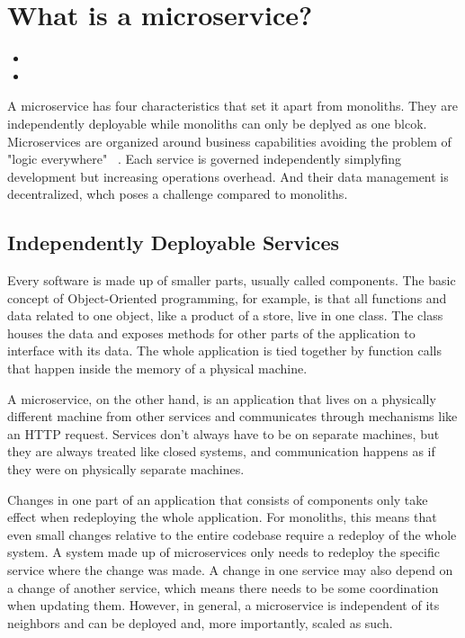 \section{What is a microservice?}
\label{sec:theory:what}

\begin{itemize}
  \item {}
  \item {}
\end{itemize}

A microservice has four characteristics that set it apart from monoliths. They are independently deployable while monoliths can only be deplyed as one blcok. Microservices are organized around business capabilities avoiding the problem of "logic everywhere" ~\cite{microservices.2014}. Each service is governed independently simplyfing development but increasing operations overhead. And their data management is decentralized, whch poses a challenge compared to monoliths.

\subsection{Independently Deployable Services}

Every software is made up of smaller parts, usually called components. The basic concept of Object-Oriented programming, for example, is that all functions and data related to one object, like a product of a store, live in one class. The class houses the data and exposes methods for other parts of the application to interface with its data. The whole application is tied together by function calls that happen inside the memory of a physical machine.

A microservice, on the other hand, is an application that lives on a physically different machine from other services and communicates through mechanisms like an HTTP request. Services don't always have to be on separate machines, but they are always treated like closed systems, and communication happens as if they were on physically separate machines.

Changes in one part of an application that consists of components only take effect when redeploying the whole application. For monoliths, this means that even small changes relative to the entire codebase require a redeploy of the whole system. A system made up of microservices only needs to redeploy the specific service where the change was made. A change in one service may also depend on a change of another service, which means there needs to be some coordination when updating them. However, in general, a microservice is independent of its neighbors and can be deployed and, more importantly, scaled as such.


